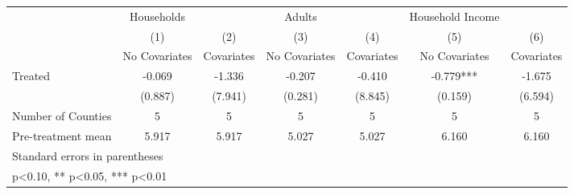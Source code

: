 {
\def\sym#1{\ifmmode^{#1}\else\(^{#1}\)\fi}
\begin{tabular}{l*{6}{c}}
\hline\hline
            &  Households   &               &      Adults   &               &Household Income   &               \\
            &\multicolumn{1}{c}{(1)}&\multicolumn{1}{c}{(2)}&\multicolumn{1}{c}{(3)}&\multicolumn{1}{c}{(4)}&\multicolumn{1}{c}{(5)}&\multicolumn{1}{c}{(6)}\\
            &\multicolumn{1}{c}{No Covariates}&\multicolumn{1}{c}{Covariates}&\multicolumn{1}{c}{No Covariates}&\multicolumn{1}{c}{Covariates}&\multicolumn{1}{c}{No Covariates}&\multicolumn{1}{c}{Covariates}\\
\hline
Treated     &      -0.069   &      -1.336   &      -0.207   &      -0.410   &      -0.779***&      -1.675   \\
            &     (0.887)   &     (7.941)   &     (0.281)   &     (8.845)   &     (0.159)   &     (6.594)   \\
\hline
Number of Counties&           5   &           5   &           5   &           5   &           5   &           5   \\
Pre-treatment mean&       5.917   &       5.917   &       5.027   &       5.027   &       6.160   &       6.160   \\
\hline\hline
\multicolumn{7}{l}{\footnotesize Standard errors in parentheses}\\
\multicolumn{7}{l}{\footnotesize * p<0.10, ** p<0.05, *** p<0.01}\\
\end{tabular}
}
